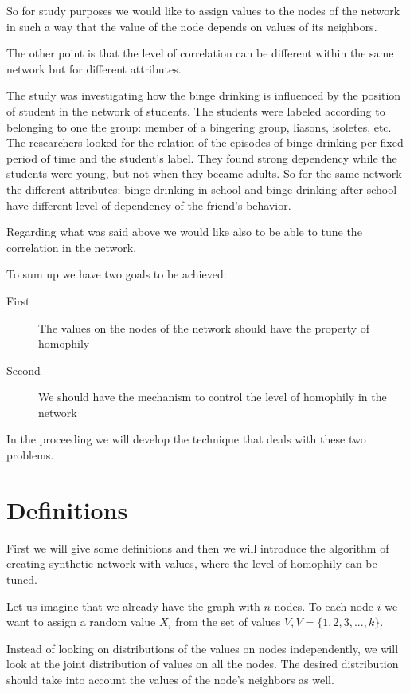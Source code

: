 \documentclass[12pt]{report}
\begin{document}
So for study purposes we would like to assign values to the nodes of the network in such a way that the value of the node depends on values of its neighbors.


The other point is that the level of correlation can be different within the same network but for different attributes. 


The study \cite{pollard2013adolescent} was investigating how the binge drinking is influenced by the position of student in the network of students. The students were labeled according to belonging to one the group: member of a bingering group, liasons, isoletes, etc. The researchers looked for the relation of the episodes of binge drinking per fixed period of time and the student's label. They found strong dependency while the students were young, but not when they became adults. So for the same network the different attributes: binge drinking in school and binge drinking after school have different level of dependency of the friend's behavior.

Regarding what was said above we would like also to be able to tune the correlation in the network. 

To sum up we have two goals to be achieved:
\begin{description}
  \item[First] The values on the nodes of the network should have the property of homophily
  \item[Second] We should have the mechanism to control the level of homophily in the network
\end{description}

In the proceeding we will develop the technique that deals with these two problems.
 
\section{Definitions}

First we will give some definitions and then we will introduce the algorithm of creating synthetic network with values, where the level of homophily can be tuned.

Let us imagine that we already have the graph with $n$ nodes. To each node $i$ we want to assign a random value $X_i$ from the set of values $V, V = \lbrace 1, 2, 3, ..., k \rbrace$. 

Instead of looking on distributions of the values on nodes independently, we will look at the joint distribution of values on all the nodes. The desired distribution should take into account the values of the node's neighbors as well.
\end{document}
